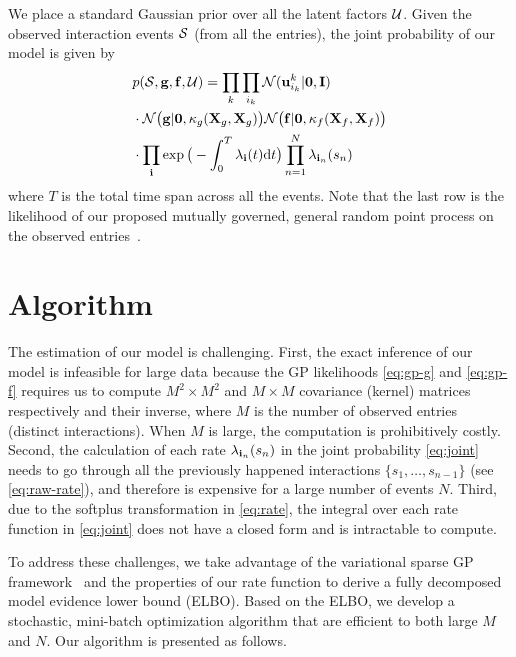 We place a standard Gaussian prior over all the latent factors ${\mathcal{U}}$. Given the observed interaction events $\mathcal{S}$ (from all the entries), the joint probability of our model is given by 
\begin{align}
&p(\mathcal{S}, {\bf g}, {\bf f}, {\mathcal{U}}) = \prod_k\prod_{i_k} \mathcal{N}({\bf u}_{i_k}^k|{\bf 0}, {\bf I}) \notag \\
&\cdot \mathcal{N}\big({\bf g}|{\bf 0}, \kappa_g({\bf X}_g, {\bf X}_g)\big) \mathcal{N}\big({\bf f}|{\bf 0}, \kappa_f({\bf X}_f, {\bf X}_f)\big) \notag \\
&\cdot \prod_{{\bf i}} \exp\big(-\int_0^T \lambda_{{\bf i}}(t){\rm d} t\big) \prod_{n=1}^N \lambda_{{\bf i}_n}(s_n) \label{eq:joint}
\end{align}
where $T$ is the total time span across all the events. Note that the last row is the likelihood of our proposed mutually governed, general random point process on the observed entries~\citep{daley2007introduction}.
\vspace{-0.1in}
\section{Algorithm}
\vspace{-0.05in}
The estimation of our model is challenging. First, the exact inference of our model is infeasible for large data because the GP likelihoods \eqref{eq:gp-g} and \eqref{eq:gp-f} requires us to compute $M^2 \times M^2$ and $M \times M$ covariance (kernel) matrices respectively and their inverse, where $M$ is the number of observed entries (\ie distinct interactions). When $M$ is large, the computation is prohibitively costly. Second, the calculation of each rate $\lambda_{{\bf i}_n}(s_n)$ in the joint probability \eqref{eq:joint} needs to go through all the previously happened interactions $\{s_1, \ldots, s_{n-1}\}$ (see \eqref{eq:raw-rate}), and therefore is expensive for a  large number of events $N$. Third, due to the softplus transformation in \eqref{eq:rate}, the integral over each rate function in \eqref{eq:joint} does not have a closed form and is intractable to compute.  

To address these challenges, we take advantage of the variational sparse GP framework~\citep{hensman2013gaussian} and the properties of our rate function to derive a fully decomposed model evidence lower bound (ELBO). Based on the ELBO, we develop a stochastic, mini-batch optimization algorithm that are efficient to both large $M$ and $N$. Our algorithm is presented as follows.  

\vspace{-0.1in}
